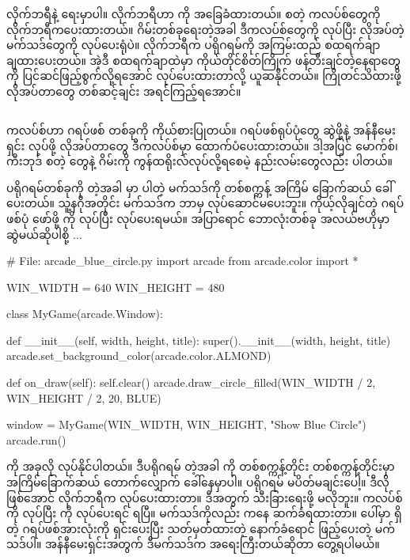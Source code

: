  လိုက်ဘရီနဲ့ ရေးမှာပါ။  လိုက်ဘရီဟာ  ကို အခြေခံထားတယ်။ \fEn{,} \fEn{,}  စတဲ့ ကလပ်စ်တွေကို လိုက်ဘရီကပေးထားတယ်။ ဂိမ်းတစ်ခုရေးတဲ့အခါ ဒီကလပ်စ်တွေကို  လုပ်ပြီး လိုအပ်တဲ့ မက်သဒ်တွေကို  လုပ်ပေးရုံပဲ။ လိုက်ဘရီက ပရိုဂရမ်ကို အကြမ်းထည် စထရက်ချာ ချထားပေးတယ်။ အဲ့ဒီ စထရက်ချာထဲမှာ ကိုယ်တိုင်စိတ်ကြိုက် ဖန်တီးချင်တဲ့နေရာတွေကို ပြင်ဆင်ဖြည့်စွက်လို့ရအောင် လုပ်ပေးထားတာလို့ ယူဆနိုင်တယ်။ ကြိုတင်သိထားဖို့ လိုအပ်တာတွေ တစ်ဆင့်ချင်း အရင်ကြည့်ရအောင်။

\subsection*{}
 ကလပ်စ်ဟာ ဂရပ်ဖစ်  တစ်ခုကို ကိုယ်စားပြုတယ်။ ဂရပ်ဖစ်ရုပ်ပုံတွေ ဆွဲဖို့နဲ့ အန်နီမေးရှင်း လုပ်ဖို့ လိုအပ်တာတွေ ဒီကလပ်စ်မှာ ထောက်ပံပေးထားတယ်။ ဒါ့အပြင် မောက်စ်၊ ကီးဘုဒ် စတဲ့  တွေနဲ့ ဂိမ်းကို ကွန်ထရိုးလ်လုပ်လို့ရစေမဲ့ နည်းလမ်းတွေလည်း ပါတယ်။

 ပရိုဂရမ်တစ်ခုကို  တဲ့အခါ  မှာ ပါတဲ့   မက်သဒ်ကို တစ်စက္ကန့် အကြိမ် ခြောက်ဆယ် ခေါ်ပေးတယ်။ သူ့နဂိုအတိုင်း  မက်သဒ်က ဘာမှ လုပ်ဆောင်မပေးဘူး။ ကိုယ့်လိုချင်တဲ့ ဂရပ်ဖစ်ပုံ ဖော်ဖို့  ကို  လုပ်ပြီး  လုပ်ပေးရမယ်။  အပြာရောင် ဘောလုံးတစ်ခု အလယ်ဗဟိုမှာ ဆွဲမယ်ဆိုပါစို့ $\ldots$

%
\begin{py}
# File: arcade_blue_circle.py
import arcade
from arcade.color import *

WIN_WIDTH = 640
WIN_HEIGHT = 480

class MyGame(arcade.Window):

    def __init__(self, width, height, title):
        super().__init__(width, height, title)
        arcade.set_background_color(arcade.color.ALMOND)

    def on_draw(self):
        self.clear()
        arcade.draw_circle_filled(WIN_WIDTH / 2, WIN_HEIGHT / 2, 20, BLUE)

window = MyGame(WIN_WIDTH, WIN_HEIGHT, "Show Blue Circle")
arcade.run()
\end{py}
%
 ကို အခုလို   လုပ်နိုင်ပါတယ်။ ဒီပရိုဂရမ်  တဲ့အခါ  ကို တစ်စက္ကန့်တိုင်း တစ်စက္ကန့်တိုင်းမှာ အကြိမ်ခြောက်ဆယ်  တောက်လျှောက် ခေါ်နေမှာပါ။ ပရိုဂရမ်  မပိတ်မချင်းပေါ့။ ဒီလိုဖြစ်အောင်  လိုက်ဘရီက လုပ်ပေးထားတာ။ ဒီအတွက် သီးခြားရေးဖို့ မလိုဘူး။  ကလပ်စ်ကို  လုပ်ပြီး  ကို  လုပ်ပေးရင် ရပြီ။  မက်သဒ်ကိုလည်း   ကနေ ဆက်ခံရထားတာ။  ပေါ်မှာ ရှိတဲ့ ဂရပ်ဖစ်အားလုံးကို ရှင်းပေးပြီး သတ်မှတ်ထားတဲ့ နောက်ခံရောင် ဖြည့်ပေးတဲ့ မက်သဒ်ပါ။  အန်နီမေးရှင်းအတွက် ဒီမက်သဒ်က အရေးကြီးတယ်ဆိုတာ တွေ့ရပါမယ်။ 


